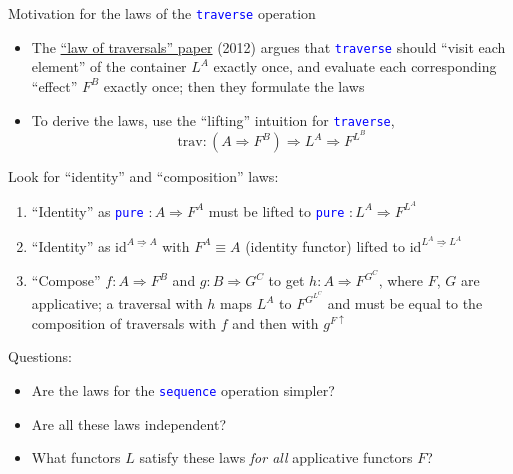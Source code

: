 \documentclass[english]{beamer}
\begin{document}
\begin{frame}{Motivation for the laws of the \texttt{\textcolor{blue}{\footnotesize{}traverse}}
operation }
\begin{itemize}
\item \vspace{-0.2cm}The \href{https://arxiv.org/pdf/1202.2919.pdf}{\textquotedblleft law of traversals\textquotedblright{} paper}
(2012) argues that \texttt{\textcolor{blue}{\footnotesize{}traverse}}
should ``visit each element'' of the container $L^{A}$ exactly
once, and evaluate each corresponding ``effect'' $F^{B}$ exactly
once; then they formulate the laws
\item To derive the laws, use the ``lifting'' intuition for \texttt{\textcolor{blue}{\footnotesize{}traverse}},{\footnotesize{}
\[
\text{trav}:(A\Rightarrow F^{B})\Rightarrow L^{A}\Rightarrow F^{L^{B}}
\]
}{\footnotesize\par}
\end{itemize}
{\footnotesize{}L}ook for ``identity'' and ``composition'' laws:
\begin{enumerate}
\item ``Identity'' as \texttt{\textcolor{blue}{\footnotesize{}pure}} $:A\Rightarrow F^{A}$
must be lifted to \texttt{\textcolor{blue}{\footnotesize{}pure}} $:L^{A}\Rightarrow F^{L^{A}}$
\item ``Identity'' as $\text{id}^{\underline{A\Rightarrow A}}$ with $F^{A}\equiv A$
(identity functor) lifted to $\text{id}^{\underline{L^{A}\Rightarrow L^{A}}}$
\item ``Compose'' $f:A\Rightarrow F^{B}$ and $g:B\Rightarrow G^{C}$
to get $h:A\Rightarrow F^{G^{C}}$, where $F$, $G$ are applicative;
a traversal with $h$ maps $L^{A}$ to $F^{G^{L^{C}}}$ and must be
equal to the composition of traversals with $f$ and then with $g^{F\uparrow}$
\end{enumerate}
Questions:
\begin{itemize}
\item Are the laws for the \texttt{\textcolor{blue}{\footnotesize{}sequence}}
operation simpler?
\item Are all these laws independent?
\item What functors $L$ satisfy these laws \emph{for all} applicative functors
$F$?
\end{itemize}
\end{frame}
\end{document}
